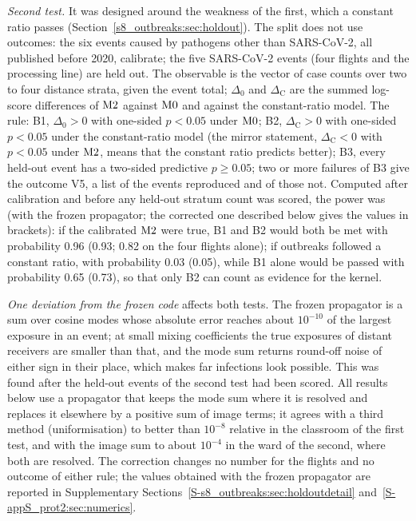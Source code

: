 \emph{Second test.} It was designed around the weakness of the first, which a constant ratio passes
(Section~\ref{s8_outbreaks:sec:holdout}). The split does not use outcomes: the six events caused by pathogens
other than SARS-CoV-2, all published before 2020, calibrate; the five SARS-CoV-2 events (four flights and the
processing line) are held out. The observable is the vector of case counts over two to four distance strata,
given the event total; $\Delta_0$ and $\Delta_{\mathrm{C}}$ are the summed log-score differences of $\mathrm{M2}$
against $\mathrm{M0}$ and against the constant-ratio model. The rule: B1, $\Delta_0>0$ with one-sided $p<0.05$ under
$\mathrm{M0}$; B2, $\Delta_{\mathrm{C}}>0$ with one-sided $p<0.05$ under the constant-ratio model (the mirror
statement, $\Delta_{\mathrm{C}}<0$ with $p<0.05$ under $\mathrm{M2}$, means that the constant ratio predicts better);
B3, every held-out event has a two-sided predictive $p\ge0.05$; two or more failures of B3 give the outcome V5, a
list of the events reproduced and of those not. Computed after calibration and before any held-out stratum count
was scored, the power was (with the frozen propagator; the corrected one described below gives the values in
brackets): if the calibrated $\mathrm{M2}$ were true, B1 and B2 would both be met with probability 0.96 (0.93; 0.82
on the four flights alone); if outbreaks followed a constant ratio, with probability 0.03 (0.05), while B1 alone
would be passed with probability 0.65 (0.73), so that only B2 can count as evidence for the kernel.

\emph{One deviation from the frozen code} affects both tests. The frozen propagator is a sum over cosine modes
whose absolute error reaches about $10^{-10}$ of the largest exposure in an event; at small mixing coefficients
the true exposures of distant receivers are smaller than that, and the mode sum returns round-off noise of
either sign in their place, which makes far infections look possible. This was found after the held-out events
of the second test had been scored. All results below use a propagator that keeps the mode sum where it is
resolved and replaces it elsewhere by a positive sum of image terms; it agrees with a third method
(uniformisation) to better than $10^{-8}$ relative in the classroom of the first test, and with the image sum to
about $10^{-4}$ in the ward of the second, where both are resolved. The correction changes no number for the flights and no
outcome of either rule; the values obtained with the frozen propagator are reported in Supplementary
Sections~\ref{S-s8_outbreaks:sec:holdoutdetail} and~\ref{S-appS_prot2:sec:numerics}.

